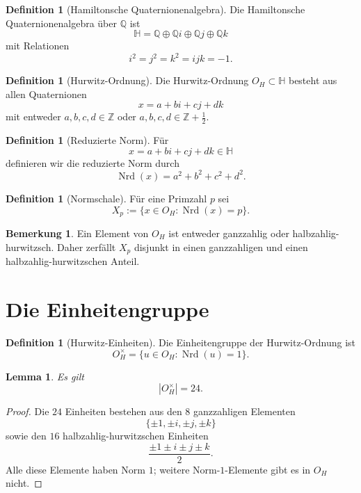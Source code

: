 \documentclass[12pt,a4paper]{article}
\newtheorem{lemma}[satz]{Lemma}
\theoremstyle{definition}
\newtheorem{definition}[satz]{Definition}
\newtheorem{bemerkung}[satz]{Bemerkung}
\newcommand{\OH}{O_H}
\newcommand{\HH}{\mathbb{H}}
\newcommand{\Z}{\mathbb{Z}}
\newcommand{\Q}{\mathbb{Q}}
\newcommand{\Nrd}{\operatorname{Nrd}}
\begin{document}
	\begin{definition}[Hamiltonsche Quaternionenalgebra]
		Die Hamiltonsche Quaternionenalgebra über \(\Q\) ist
		\[
		\HH=\Q\oplus \Q i\oplus \Q j\oplus \Q k
		\]
		mit Relationen
		\[
		i^2=j^2=k^2=ijk=-1.
		\]
	\end{definition}
	
	\begin{definition}[Hurwitz-Ordnung]
		Die Hurwitz-Ordnung \(\OH\subset \HH\) besteht aus allen Quaternionen
		\[
		x=a+bi+cj+dk
		\]
		mit entweder \(a,b,c,d\in \Z\) oder \(a,b,c,d\in \Z+\frac12\).
	\end{definition}
	
	\begin{definition}[Reduzierte Norm]
		Für
		\[
		x=a+bi+cj+dk\in \HH
		\]
		definieren wir die reduzierte Norm durch
		\[
		\Nrd(x)=a^2+b^2+c^2+d^2.
		\]
	\end{definition}
	
	\begin{definition}[Normschale]
		Für eine Primzahl \(p\) sei
		\[
		X_p:=\{x\in \OH:\Nrd(x)=p\}.
		\]
	\end{definition}
	
	\begin{bemerkung}
		Ein Element von \(\OH\) ist entweder ganzzahlig oder halbzahlig-hurwitzsch. Daher zerfällt \(X_p\) disjunkt in einen ganzzahligen und einen halbzahlig-hurwitzschen Anteil.
	\end{bemerkung}
	
	\section{Die Einheitengruppe}
	
	\begin{definition}[Hurwitz-Einheiten]
		Die Einheitengruppe der Hurwitz-Ordnung ist
		\[
		\OH^\times=\{u\in \OH:\Nrd(u)=1\}.
		\]
	\end{definition}
	
	\begin{lemma}
		Es gilt
		\[
		|\OH^\times|=24.
		\]
	\end{lemma}
	
	\begin{proof}
		Die \(24\) Einheiten bestehen aus den \(8\) ganzzahligen Elementen
		\[
		\{\pm1,\pm i,\pm j,\pm k\}
		\]
		sowie den \(16\) halbzahlig-hurwitzschen Einheiten
		\[
		\frac{\pm1\pm i\pm j\pm k}{2}.
		\]
		Alle diese Elemente haben Norm \(1\); weitere Norm-\(1\)-Elemente gibt es in \(\OH\) nicht.
	\end{proof}
	
\end{document}
